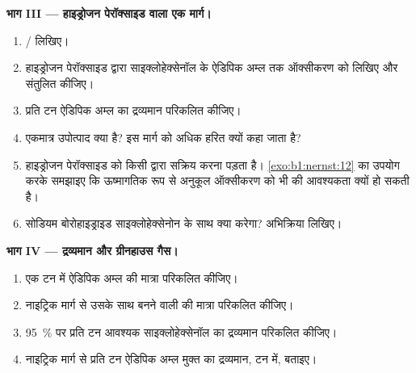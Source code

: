 \begin{problem}
\medskip
\noindent\textbf{भाग III --- हाइड्रोजन पेरॉक्साइड वाला एक मार्ग।}
\begin{enumerate}[resume]
  \item {} / लिखिए।
  \item हाइड्रोजन पेरॉक्साइड द्वारा साइक्लोहेक्सेनॉल के ऐडिपिक अम्ल तक ऑक्सीकरण को लिखिए और
        संतुलित कीजिए।
  \item प्रति टन ऐडिपिक अम्ल  का द्रव्यमान परिकलित कीजिए।
  \item एकमात्र उपोत्पाद क्या है? इस मार्ग को अधिक हरित क्यों कहा जाता है?
  \item हाइड्रोजन पेरॉक्साइड को किसी  द्वारा सक्रिय करना पड़ता है।
        \cref{exo:b1:nernst:12} का उपयोग करके समझाइए कि ऊष्मागतिक रूप से अनुकूल
        ऑक्सीकरण को भी  की आवश्यकता क्यों हो सकती है।
  \item सोडियम बोरोहाइड्राइड साइक्लोहेक्सेनोन के साथ क्या करेगा? अभिक्रिया
        लिखिए।
\end{enumerate}

\medskip
\noindent\textbf{भाग IV --- द्रव्यमान और ग्रीनहाउस गैस।}
\begin{enumerate}[resume]
  \item एक टन में ऐडिपिक अम्ल की मात्रा परिकलित कीजिए।
  \item नाइट्रिक मार्ग से उसके साथ बनने वाली  की मात्रा परिकलित कीजिए।
  \item \qty{95}{\percent}  पर प्रति टन आवश्यक साइक्लोहेक्सेनॉल का द्रव्यमान
        परिकलित कीजिए।
  \item नाइट्रिक मार्ग से प्रति टन ऐडिपिक अम्ल मुक्त  का द्रव्यमान,
        टन में, बताइए।
\end{enumerate}
\end{problem}
